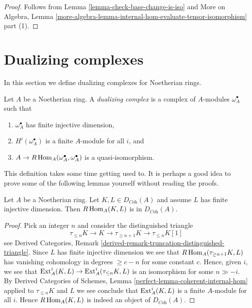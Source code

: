 \begin{proof}
Follows from Lemma \ref{lemma-check-base-change-is-iso} and
More on Algebra, Lemma
\ref{more-algebra-lemma-internal-hom-evaluate-tensor-isomorphism} part (1).
\end{proof}







\section{Dualizing complexes}
\label{section-dualizing}

\noindent
In this section we define dualizing complexes for Noetherian rings.

\begin{definition}
\label{definition-dualizing}
Let $A$ be a Noetherian ring. A {\it dualizing complex} is a
complex of $A$-modules $\omega_A^\bullet$ such that
\begin{enumerate}
\item $\omega_A^\bullet$ has finite injective dimension,
\item $H^i(\omega_A^\bullet)$ is a finite $A$-module for all $i$, and
\item $A \to R\mathop{\mathrm{Hom}}\nolimits_A(\omega_A^\bullet, \omega_A^\bullet)$
is a quasi-isomorphism.
\end{enumerate}
\end{definition}

\noindent
This definition takes some time getting used to. It is perhaps a good
idea to prove some of the following lemmas yourself without reading
the proofs.

\begin{lemma}
\label{lemma-finite-ext-into-bounded-injective}
Let $A$ be a Noetherian ring. Let $K, L \in D_{\textit{Coh}}(A)$
and assume $L$ has finite injective dimension. Then
$R\mathop{\mathrm{Hom}}\nolimits_A(K, L)$ is in $D_{\textit{Coh}}(A)$.
\end{lemma}

\begin{proof}
Pick an integer $n$ and consider the distinguished triangle
$$
\tau_{\leq n}K \to K \to \tau_{\geq n + 1}K \to \tau_{\leq n}K[1]
$$
see Derived Categories, Remark
\ref{derived-remark-truncation-distinguished-triangle}.
Since $L$ has finite injective dimension we see
that $R\mathop{\mathrm{Hom}}\nolimits_A(\tau_{\geq n + 1}K, L)$ has vanishing
cohomology in degrees $\geq c - n$ for some constant $c$.
Hence, given $i$, we see that
$\mathop{\mathrm{Ext}}\nolimits^i_A(K, L) \to \mathop{\mathrm{Ext}}\nolimits^i_A(\tau_{\leq n}K, L)$
is an isomorphism for some $n \gg - i$. By
Derived Categories of Schemes, Lemma \ref{perfect-lemma-coherent-internal-hom}
applied to $\tau_{\leq n}K$ and $L$
we see conclude that $\mathop{\mathrm{Ext}}\nolimits^i_A(K, L)$ is
a finite $A$-module for all $i$. Hence $R\mathop{\mathrm{Hom}}\nolimits_A(K, L)$
is indeed an object of $D_{\textit{Coh}}(A)$.
\end{proof}

